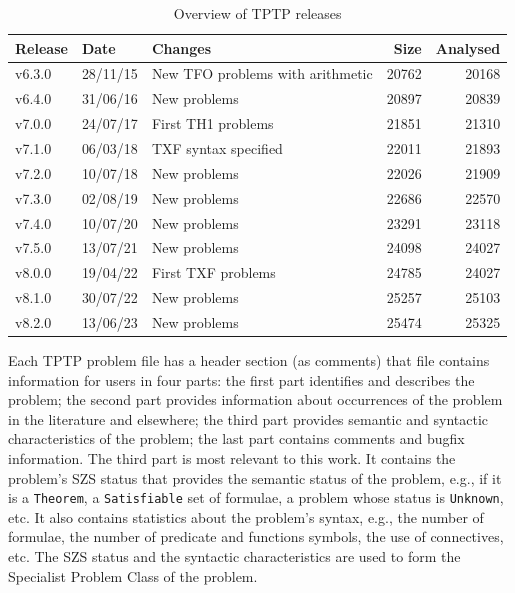 \documentclass[runningheads]{llncs}
\begin{document}
\begin{table}[htb]
\begin{center}
\setlength{\tabcolsep}{4pt}
\begin{tabular}{ll|l|rr}
Release & Date     & Changes                                 & Size & Analysed \\
\hline
v6.3.0  & 28/11/15 & New TFO problems with arithmetic        &   20762 & 20168 \\
v6.4.0  & 31/06/16 & New problems                            &   20897 & 20839 \\
v7.0.0  & 24/07/17 & First TH1 problems                      &   21851 & 21310 \\
v7.1.0  & 06/03/18 & TXF syntax specified                    &   22011 & 21893 \\
v7.2.0  & 10/07/18 & New problems                            &   22026 & 21909 \\
v7.3.0  & 02/08/19 & New problems                            &   22686 & 22570 \\
v7.4.0  & 10/07/20 & New problems                            &   23291 & 23118 \\
v7.5.0  & 13/07/21 & New problems                            &   24098 & 24027 \\
v8.0.0  & 19/04/22 & First TXF problems                      &   24785 & 24027 \\
v8.1.0  & 30/07/22 & New problems                            &   25257 & 25103 \\
v8.2.0  & 13/06/23 & New problems                            &   25474 & 25325 \\
\end{tabular}
\end{center}
\caption{Overview of TPTP releases}
\label{TPTPReleases}
\end{table}

Each TPTP problem file has a header section (as comments) that file contains information for users
in four parts:
the first part identifies and describes the problem;
the second part provides information about occurrences of the problem in the literature and 
elsewhere;
the third part provides semantic and syntactic characteristics of the problem;
the last part contains comments and bugfix information.
The third part is most relevant to this work. 
It contains the problem's SZS status \cite{SZS03} that provides the semantic status of the 
problem, e.g., if it is a {\tt Theorem}, a {\tt Satisfiable} set of formulae, a problem whose 
status is {\tt Unknown}, etc.
It also contains statistics about the problem's syntax, e.g., the number of formulae, the 
number of predicate and functions symbols, the use of connectives, etc.
The SZS status and the syntactic characteristics are used to form the Specialist Problem Class
of the problem.
\end{document}
